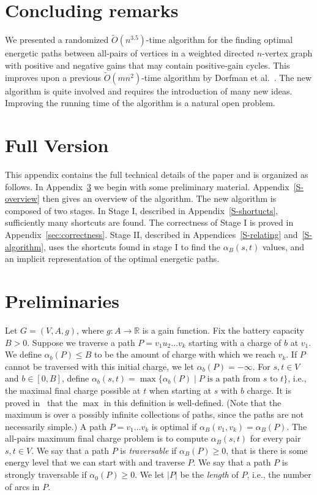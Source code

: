 \documentclass[11pt]{article}
\newcommand{\RR}{\mathbb{R}}
\begin{document}
\section{Concluding remarks}\label{S-concl}

We presented a randomized $\tilde{O}(n^{3.5})$-time algorithm for the finding optimal energetic paths between all-pairs of vertices in a weighted directed $n$-vertex graph with positive and negative gains that may contain positive-gain cycles. This improves upon a previous $\tilde{O}(mn^{2})$-time algorithm by Dorfman et al.~\cite{DorfmanKTZ23}. The new algorithm is quite involved and requires the introduction of many new ideas. Improving the running time of the algorithm is a natural open problem. 




\appendix

\section{Full Version}

This appendix contains the full technical details of the paper and is organized as follows. In Appendix~\ref{S:prelim} we begin with some preliminary material. Appendix~\ref{S-overview} then gives an overview of the algorithm. The new algorithm is composed of two stages. In Stage I, described in Appendix~\ref{S-shortucts}, sufficiently many shortcuts are found. The correctness of Stage I is proved in Appendix~\ref{sec:correctness}. Stage II, described in Appendices~\ref{S-relating} and~\ref{S-algorithm}, uses the shortcuts found in stage I to find the $\alpha_B(s,t)$ values, and an implicit representation of the optimal energetic paths.

\section{Preliminaries}\label{S:prelim}

Let $G=(V,A,g)$, where $g:A\to\RR$ is a gain function.
Fix the battery capacity $B> 0 $.
Suppose we traverse a path
$P=v_1 u_2\ldots v_k$ 
starting with a charge of $b$ at $v_1$. We define
$\alpha_b(P)\le B$ to be the amount of charge with which we reach $v_k$. If $P$ cannot be traversed with this initial charge, we let $\alpha_b(P) = -\infty$. For $s,t\in V$ and $b\in [0,B]$, define $\alpha_b(s,t)=\max \{ \alpha_b(P) \mid \text{$P$ is a path from $s$ to $t$}\}$, i.e., the maximal final charge possible at $t$ when starting at $s$ with  $b$ charge. It is proved in~\cite{DorfmanKTZ23} that the $\max$ in this definition is well-defined. (Note that the maximum is over a possibly infinite collections of paths, since the paths are not necessarily simple.) A path $P=v_1\ldots v_k$ is optimal if $\alpha_B(v_1,v_k)=\alpha_B(P)$. The all-pairs maximum final charge problem is to compute $\alpha_B(s,t)$ for every pair $s,t\in V$. We say that a path $P$ is \emph{traversable} if $\alpha_B(P)\ge 0$, that is there is some energy level  that we can start with and traverse $P$. We say that a path $P$ is strongly traversable if $\alpha_0(P)\ge 0$. We let $|P|$ be the \emph{length} of $P$, i.e., the number of arcs in $P$.
\end{document}
